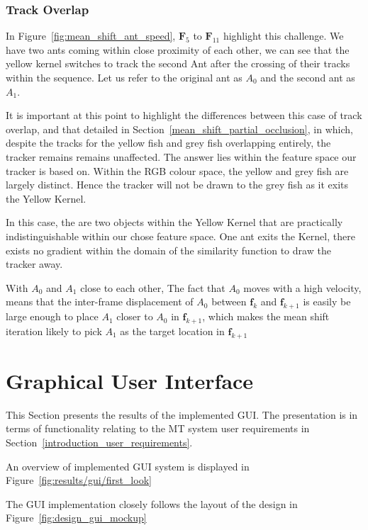 \subsubsection{Track Overlap}\label{mean_shift_track_overlap}
In Figure~\ref{fig:mean_shift_ant_speed}, $\mathbf{F}_5$ to $\mathbf{F}_{11}$
highlight this challenge. We have two ants coming within close proximity of
each other, we can see that the yellow kernel switches to track the second Ant
after the crossing of their tracks within the sequence. Let us refer to the
original ant as $A_0$ and the second ant as $A_1$. 

It is important at this point to highlight the differences between this case of
track overlap, and that detailed in Section~\ref{mean_shift_partial_occlusion},
in which, despite the tracks for the yellow fish and grey fish overlapping
entirely, the tracker remains remains unaffected.
The answer lies within the feature space our tracker is based on. Within the RGB colour space,
the yellow and grey fish are largely distinct. Hence the tracker will not be
drawn to the grey fish as it exits the Yellow Kernel.

In this case, the are two objects within the Yellow Kernel that are practically
indistinguishable within our chose feature space. One ant exits the Kernel, there exists
no gradient within the domain of the similarity function to draw the tracker away.

With $A_0$ and $A_1$ close to each other, The fact that $A_0$ moves with a high
velocity, means that the inter-frame displacement of $A_0$ between
$\mathbf{f}_k$ and $\mathbf{f}_{k+1}$ is easily be large enough to place $A_1$
closer to $A_0$ in $\mathbf{f}_{k+1}$, which makes the mean shift iteration
likely to pick $A_1$ as the target location in $\mathbf{f}_{k+1}$

\section{Graphical User Interface}\label{results_gui}
This Section presents the results of the implemented GUI. The presentation is in
terms of functionality relating to the MT system user requirements in
Section~\ref{introduction_user_requirements}.

An overview of implemented GUI system is displayed in Figure~\ref{fig:results/gui/first_look}

The GUI implementation closely follows the layout of the design in
Figure~\ref{fig:design_gui_mockup} 

